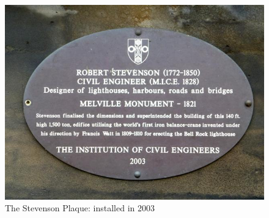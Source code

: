 \documentclass{scrartcl}
\begin{document}
\begin{appendices}
\begin{figure}
    \centering
    \includegraphics[width=1\linewidth]{img/stevenson_plaque.jpg}
    \caption{The Stevenson Plaque: installed in 2003}
    \label{fig:stevenson_plaque}
\end{figure}
\begin{figure}
    \centering

\end{figure}
\end{appendices}
\end{document}
